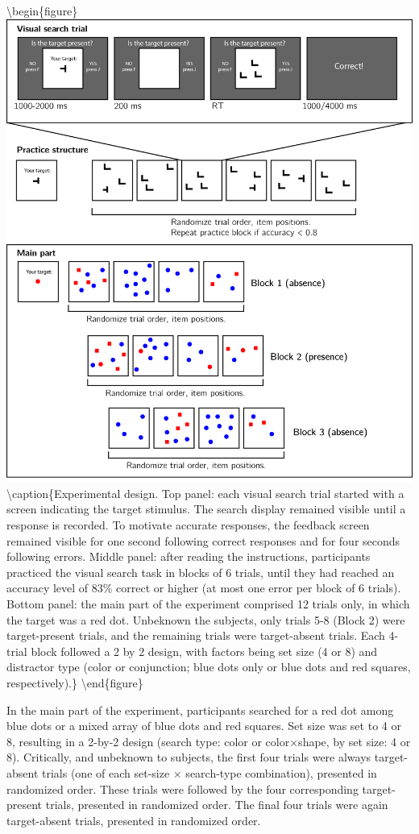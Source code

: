 \documentclass[
  english,
  man]{apa6}
\begin{document}
\textbackslash begin\{figure\}
\includegraphics[width=1\linewidth]{figures/designExp1} \textbackslash caption\{Experimental design. Top panel: each visual search trial started with a screen indicating the target stimulus. The search display remained visible until a response is recorded. To motivate accurate responses, the feedback screen remained visible for one second following correct responses and for four seconds following errors. Middle panel: after reading the instructions, participants practiced the visual search task in blocks of 6 trials, until they had reached an accuracy level of 83\% correct or higher (at most one error per block of 6 trials). Bottom panel: the main part of the experiment comprised 12 trials only, in which the target was a red dot. Unbeknown the subjects, only trials 5-8 (Block 2) were target-present trials, and the remaining trials were target-absent trials. Each 4-trial block followed a 2 by 2 design, with factors being set size (4 or 8) and distractor type (color or conjunction; blue dots only or blue dots and red squares, respectively).\}\label{fig:design}
\textbackslash end\{figure\}

In the main part of the experiment, participants searched for a red dot among blue dots or a mixed array of blue dots and red squares. Set size was set to 4 or 8, resulting in a 2-by-2 design (search type: color or color\(\times\)shape, by set size: 4 or 8). Critically, and unbeknown to subjects, the first four trials were always target-absent trials (one of each set-size \(\times\) search-type combination), presented in randomized order. These trials were followed by the four corresponding target-present trials, presented in randomized order. The final four trials were again target-absent trials, presented in randomized order.
\end{document}
